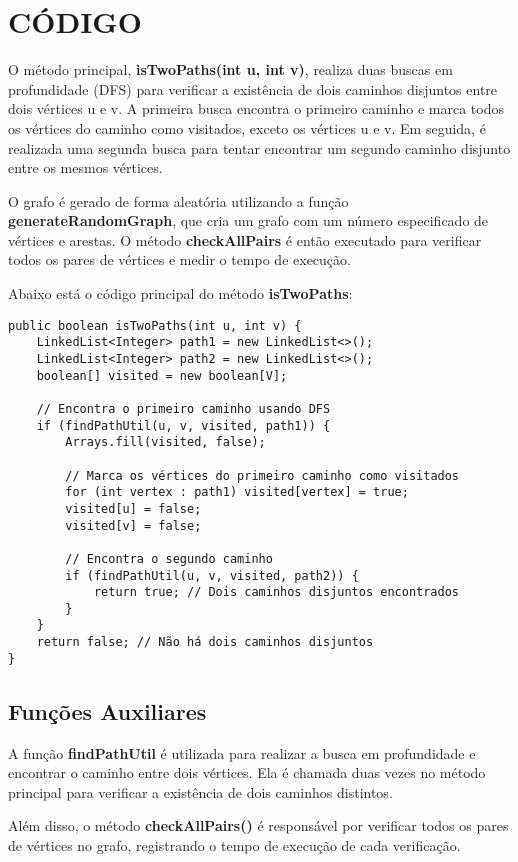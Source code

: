 \section{\esp CÓDIGO}
O método principal, \textbf{isTwoPaths(int u, int v)}, realiza duas buscas em profundidade (DFS) para verificar a existência de dois caminhos disjuntos entre dois vértices u e v. A primeira busca encontra o primeiro caminho e marca todos os vértices do caminho como visitados, exceto os vértices u e v. Em seguida, é realizada uma segunda busca para tentar encontrar um segundo caminho disjunto entre os mesmos vértices.

O grafo é gerado de forma aleatória utilizando a função \textbf{generateRandomGraph}, que cria um grafo com um número especificado de vértices e arestas. O método \textbf{checkAllPairs} é então executado para verificar todos os pares de vértices e medir o tempo de execução.

Abaixo está o código principal do método \textbf{isTwoPaths}:

\begin{verbatim}
public boolean isTwoPaths(int u, int v) {
    LinkedList<Integer> path1 = new LinkedList<>();
    LinkedList<Integer> path2 = new LinkedList<>();
    boolean[] visited = new boolean[V];
    
    // Encontra o primeiro caminho usando DFS
    if (findPathUtil(u, v, visited, path1)) {
        Arrays.fill(visited, false);
        
        // Marca os vértices do primeiro caminho como visitados
        for (int vertex : path1) visited[vertex] = true;
        visited[u] = false;
        visited[v] = false;
        
        // Encontra o segundo caminho
        if (findPathUtil(u, v, visited, path2)) {
            return true; // Dois caminhos disjuntos encontrados
        }
    }
    return false; // Não há dois caminhos disjuntos
}
\end{verbatim}

\subsection{\esp Funções Auxiliares}
A função \textbf{findPathUtil} é utilizada para realizar a busca em profundidade e encontrar o caminho entre dois vértices. Ela é chamada duas vezes no método principal para verificar a existência de dois caminhos distintos.

Além disso, o método \textbf{checkAllPairs()} é responsável por verificar todos os pares de vértices no grafo, registrando o tempo de execução de cada verificação.


